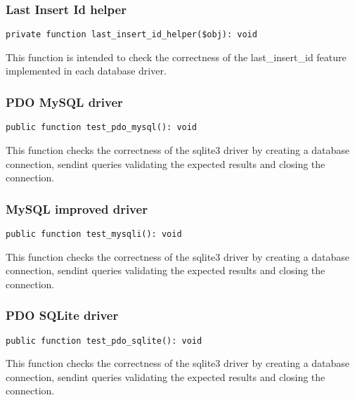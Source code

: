 \documentclass[a4paper]{article}
\begin{document}
\hypertarget{toc122}{}
\subsubsection{Last Insert Id helper}

\begin{lstlisting}
private function last_insert_id_helper($obj): void
\end{lstlisting}

This function is intended to check the correctness of the last\_insert\_id
feature implemented in each database driver.

\hypertarget{toc123}{}
\subsubsection{PDO MySQL driver}

\begin{lstlisting}
public function test_pdo_mysql(): void
\end{lstlisting}

This function checks the correctness of the sqlite3 driver by creating a
database connection, sendint queries validating the expected results and
closing the connection.

\hypertarget{toc124}{}
\subsubsection{MySQL improved driver}

\begin{lstlisting}
public function test_mysqli(): void
\end{lstlisting}

This function checks the correctness of the sqlite3 driver by creating a
database connection, sendint queries validating the expected results and
closing the connection.

\hypertarget{toc125}{}
\subsubsection{PDO SQLite driver}

\begin{lstlisting}
public function test_pdo_sqlite(): void
\end{lstlisting}

This function checks the correctness of the sqlite3 driver by creating a
database connection, sendint queries validating the expected results and
closing the connection.
\end{document}
